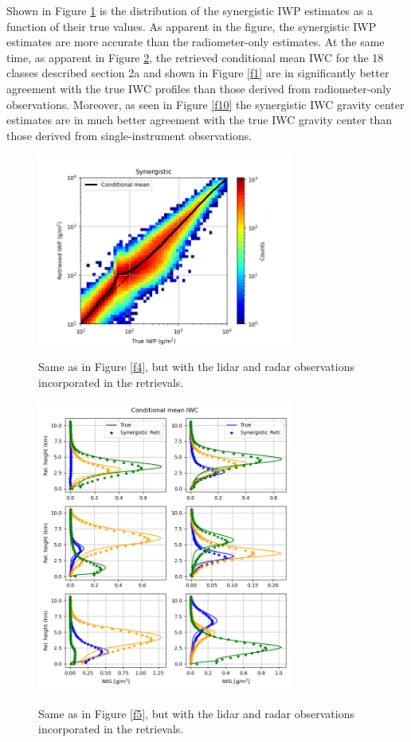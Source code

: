 \documentclass{ametsocV6.1}
\begin{document}
Shown in Figure \ref{f8} is the distribution of the synergistic IWP estimates as a function of their true values.  As apparent in the figure, the synergistic IWP estimates are more accurate than the radiometer-only estimates. At the same time, as apparent in Figure \ref{f9}, the retrieved conditional mean IWC for the 18 classes described section 2a and shown in Figure \ref{f1} are in significantly better agreement with the true IWC profiles than those derived from radiometer-only observations.  Moreover, as seen in Figure \ref{f10} the synergistic IWC gravity center estimates are in much better agreement with the true IWC gravity center than those derived from single-instrument observations.

\begin{figure}[t]
    \centering
    \includegraphics[width=0.75\textwidth,angle=0]{fig08.rev.png}\\
    \caption{Same as in Figure \ref{f4}, but with the lidar and radar observations incorporated in the
    retrievals.}\label{f8}
\end{figure}

\begin{figure}[t]
    \centering
    \includegraphics[width=0.75\textwidth,angle=0]{fig09.rev.png}\\
    \caption{Same as in Figure \ref{f5}, but with the lidar and radar observations incorporated in the
    retrievals.}\label{f9}
\end{figure}
\end{document}
